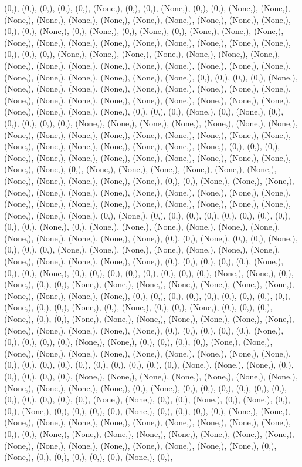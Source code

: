 \documentclass{article}
\begin{document}
(0,), (0,), (0,), (0,), (0,), (None,), (0,), (0,), (None,), (0,), (0,), (None,), (None,), (None,), (None,), (None,), (None,), (None,), (None,), (None,), (None,), (None,), (0,), (0,), (None,), (0,), (None,), (0,), (None,), (0,), (None,), (None,), (None,), (None,), (None,), (None,), (None,), (None,), (None,), (None,), (None,), (None,), (0,), (0,), (0,), (None,), (None,), (None,), (None,), (None,), (None,), (None,), (None,), (None,), (None,), (None,), (None,), (None,), (None,), (None,), (None,), (None,), (None,), (None,), (None,), (None,), (None,), (0,), (0,), (0,), (0,), (None,), (None,), (None,), (None,), (None,), (None,), (None,), (None,), (None,), (None,), (None,), (None,), (None,), (None,), (None,), (None,), (None,), (None,), (None,), (None,), (None,), (None,), (None,), (0,), (0,), (0,), (None,), (0,), (None,), (0,), (0,), (0,), (0,), (0,), (None,), (None,), (None,), (None,), (None,), (None,), (None,), (None,), (None,), (None,), (None,), (None,), (None,), (None,), (None,), (None,), (None,), (None,), (None,), (None,), (None,), (None,), (None,), (0,), (0,), (0,), (None,), (None,), (None,), (None,), (None,), (None,), (None,), (None,), (None,), (None,), (None,), (0,), (None,), (None,), (None,), (None,), (None,), (None,), (None,), (None,), (None,), (None,), (None,), (0,), (0,), (None,), (None,), (None,), (None,), (None,), (None,), (None,), (None,), (None,), (None,), (None,), (None,), (None,), (None,), (None,), (None,), (None,), (None,), (None,), (None,), (None,), (None,), (None,), (None,), (0,), (None,), (0,), (0,), (0,), (0,), (0,), (0,), (0,), (0,), (0,), (0,), (None,), (0,), (None,), (None,), (None,), (None,), (None,), (None,), (None,), (None,), (None,), (None,), (None,), (0,), (0,), (None,), (0,), (0,), (None,), (0,), (0,), (0,), (None,), (None,), (None,), (None,), (None,), (None,), (None,), (None,), (None,), (None,), (None,), (None,), (0,), (0,), (0,), (0,), (0,), (None,), (0,), (0,), (None,), (0,), (0,), (0,), (0,), (0,), (0,), (0,), (0,), (None,), (None,), (0,), (None,), (0,), (0,), (None,), (None,), (None,), (None,), (None,), (None,), (None,), (None,), (None,), (None,), (None,), (0,), (0,), (0,), (0,), (0,), (0,), (0,), (0,), (0,), (None,), (0,), (0,), (None,), (0,), (None,), (0,), (0,), (None,), (0,), (0,), (0,), (None,), (0,), (0,), (None,), (None,), (None,), (None,), (None,), (None,), (None,), (None,), (None,), (None,), (None,), (None,), (0,), (0,), (0,), (0,), (0,), (None,), (0,), (0,), (0,), (0,), (None,), (None,), (0,), (0,), (0,), (0,), (None,), (None,), (None,), (None,), (None,), (None,), (None,), (None,), (None,), (None,), (None,), (0,), (0,), (0,), (0,), (0,), (0,), (0,), (0,), (0,), (0,), (None,), (None,), (None,), (0,), (0,), (0,), (0,), (0,), (None,), (None,), (None,), (None,), (None,), (None,), (None,), (None,), (None,), (None,), (None,), (0,), (None,), (0,), (0,), (0,), (0,), (0,), (0,), (0,), (0,), (0,), (0,), (0,), (None,), (None,), (0,), (0,), (None,), (0,), (None,), (0,), (0,), (None,), (0,), (0,), (0,), (0,), (None,), (0,), (0,), (0,), (0,), (None,), (None,), (None,), (None,), (None,), (None,), (None,), (None,), (None,), (None,), (None,), (0,), (0,), (None,), (None,), (None,), (None,), (None,), (None,), (None,), (None,), (None,), (None,), (None,), (None,), (None,), (None,), (None,), (None,), (0,), (None,), (0,), (0,), (0,), (0,), (0,), (None,), (0,), 
\end{document}

